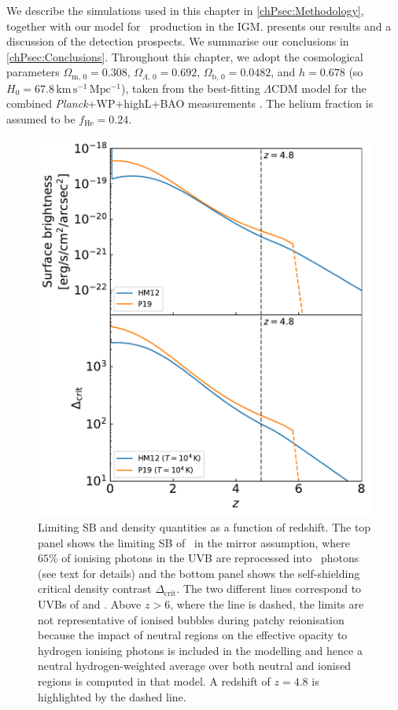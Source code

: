 We describe the simulations used in this chapter in \cref{chPsec:Methodology}, together with our model for \lya\ production in the IGM.  presents our results and a discussion of the detection prospects. We summarise our conclusions in \cref{chPsec:Conclusions}. Throughout this chapter, we adopt the cosmological parameters $\Omega_{\text{m}, \, 0} = 0.308$, $\Omega_{\Lambda, \, 0} = 0.692$, $\Omega_{\text{b}, \, 0} = 0.0482$, and $h=0.678$ (so $H_0 = 67.8 \, \mathrm{km \, s^{-1} \, Mpc^{-1}}$), taken from the best-fitting $\Lambda$CDM model for the combined \textit{Planck}+WP+highL+BAO measurements \citep{2014A&A...571A..16P}. The helium fraction is assumed to be $f_\text{He} = 0.24$.
\begin{figure}
    \centering
    \includegraphics[width=0.6\linewidth]{"Plots/ChapterP/UVB_limits"}
    \caption[Limiting SB and density quantities as a function of redshift.]
    {Limiting SB and density quantities as a function of redshift. The top panel shows the limiting SB of \lya\ in the mirror assumption, where $65\%$ of ionising photons in the UVB are reprocessed into \lya\ photons (see text for details) and the bottom panel shows the self-shielding critical density contrast $\Delta_\text{crit}$. The two different lines correspond to UVBs of \citet[, ]{2012ApJ...746..125H} and \citet[, ]{2019MNRAS.485...47P}. Above $z>6$, where the line is dashed, the  limits are not representative of ionised bubbles during patchy reionisation because the impact of neutral regions on the effective opacity to hydrogen ionising photons is included in the modelling  and hence a neutral hydrogen-weighted average over both neutral and ionised regions is computed in that model. A redshift of $z=4.8$ is highlighted by the dashed line.}
    \label{chPfig:UVB_limits}
\end{figure}

